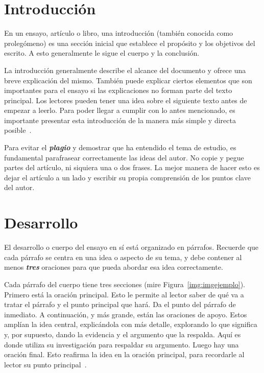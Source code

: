 \documentclass[10pt, oneside]{article}
\date{\today}
\begin{document}
\maketitle

\section{Introducción}
En un ensayo, artículo o libro, una introducción (también conocida como prolegómeno) es una sección inicial que establece el propósito y los objetivos del escrito. A esto generalmente le sigue el cuerpo y la conclusión.

La introducción generalmente describe el alcance del documento y ofrece una breve explicación del mismo. También puede explicar ciertos elementos que son importantes para el ensayo si las explicaciones no forman parte del texto principal. Los lectores pueden tener una idea sobre el siguiente texto antes de empezar a leerlo. Para poder llegar a cumplir con lo antes mencionado, es importante presentar esta introducción de la manera más simple y directa posible~\cite{c2014lenguaje}. 

Para evitar el \textbf{\emph{plagio}} y demostrar que ha entendido el tema de estudio, es fundamental parafrasear correctamente las ideas del autor. No copie y pegue partes del artículo, ni siquiera una o dos frases. La mejor manera de hacer esto es dejar el artículo a un lado y escribir su propia comprensión de los puntos clave del autor.

\section{Desarrollo}
El desarrollo o cuerpo del ensayo en sí está organizado en párrafos. Recuerde que cada párrafo se centra en una idea o aspecto de su tema, y debe contener al menos \textbf{\emph{tres}} oraciones para que pueda abordar esa idea correctamente.

Cada párrafo del cuerpo tiene tres secciones (mire Figura~\ref{img:imgejemplo}). Primero está la oración principal. Esto le permite al lector saber de qué va a tratar el párrafo y el punto principal que hará. Da el punto del párrafo de inmediato. A continuación, y más grande, están las oraciones de apoyo. Estos amplían la idea central, explicándola con más detalle, explorando lo que significa y, por supuesto, dando la evidencia y el argumento que la respalda. Aquí es donde utiliza su investigación para respaldar su argumento. Luego hay una oración final. Esto reafirma la idea en la oración principal, para recordarle al lector su punto principal~\cite{kiamotorattack}.
\end{document}
